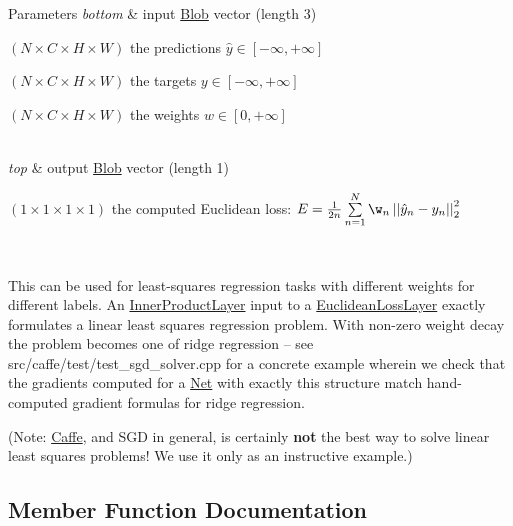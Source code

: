 \begin{DoxyParams}{Parameters}
{\em bottom} & input \mbox{\hyperlink{classcaffe_1_1_blob}{Blob}} vector (length 3)
\begin{DoxyEnumerate}
\item $ (N \times C \times H \times W) $ the predictions $ \hat{y} \in [-\infty, +\infty]$
\item $ (N \times C \times H \times W) $ the targets $ y \in [-\infty, +\infty]$
\item $ (N \times C \times H \times W) $ the weights $ w \in [0, +\infty] $ 
\end{DoxyEnumerate}\\
\hline
{\em top} & output \mbox{\hyperlink{classcaffe_1_1_blob}{Blob}} vector (length 1)
\begin{DoxyEnumerate}
\item $ (1 \times 1 \times 1 \times 1) $ the computed Euclidean loss\+: $ E = \frac{1}{2n} \sum\limits_{n=1}^N \w_n \left| \left| \hat{y}_n - y_n \right| \right|_2^2 $
\end{DoxyEnumerate}\\
\hline
\end{DoxyParams}
This can be used for least-\/squares regression tasks with different weights for different labels. An \mbox{\hyperlink{classcaffe_1_1_inner_product_layer}{Inner\+Product\+Layer}} input to a \mbox{\hyperlink{classcaffe_1_1_euclidean_loss_layer}{Euclidean\+Loss\+Layer}} exactly formulates a linear least squares regression problem. With non-\/zero weight decay the problem becomes one of ridge regression -- see src/caffe/test/test\+\_\+sgd\+\_\+solver.\+cpp for a concrete example wherein we check that the gradients computed for a \mbox{\hyperlink{classcaffe_1_1_net}{Net}} with exactly this structure match hand-\/computed gradient formulas for ridge regression.

(Note\+: \mbox{\hyperlink{classcaffe_1_1_caffe}{Caffe}}, and S\+GD in general, is certainly {\bfseries not} the best way to solve linear least squares problems! We use it only as an instructive example.) 

\subsection{Member Function Documentation}
\mbox{\label{classcaffe_1_1_weighted_euclidean_loss_layer_a6b996834a2a27bb8d2d9b48873b6cd65}} 
